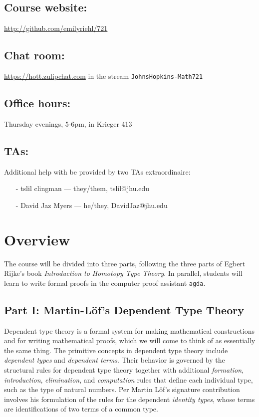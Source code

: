 \documentclass{amsart}
\theoremstyle{definition}
\theoremstyle{remark}
\numberwithin{equation}{section}
\begin{document}
 \subsection*{Course website:} \url{http://github.com/emilyriehl/721}
\subsection*{Chat room:} \url{https://hott.zulipchat.com} in the stream \texttt{JohnsHopkins-Math721}

 \subsection*{Office hours:} Thursday evenings, 5-6pm, in Krieger 413

\subsection*{TAs:} Additional help with be provided by two TAs extraordinaire:
\begin{itemize}
\item[-] tslil clingman --- they/them, tslil@jhu.edu 
\item[-] David Jaz Myers --- he/they, DavidJaz@jhu.edu 
\end{itemize}


\section*{Overview} 

The course will be divided into three parts, following the three parts of Egbert Rijke's book \emph{Introduction to Homotopy Type Theory}. In parallel, students will learn to write formal proofs in the computer proof assistant \texttt{agda}.

\subsection*{Part I: Martin-L\"{o}f's Dependent Type Theory} Dependent type theory is a formal system for making mathematical constructions and for writing mathematical proofs, which we will come to think of as essentially the same thing. The primitive concepts in dependent type theory include \emph{dependent types} and \emph{dependent terms}. Their behavior is governed by the structural rules for dependent type theory together with additional \emph{formation}, \emph{introduction}, \emph{elimination}, and \emph{computation} rules that define each individual type, such as the type of natural numbers. Per Martin L\"{o}f's signature contribution involves his formulation of the rules for the dependent \emph{identity types}, whose terms are identifications of two terms of a common type. 
\end{document}
